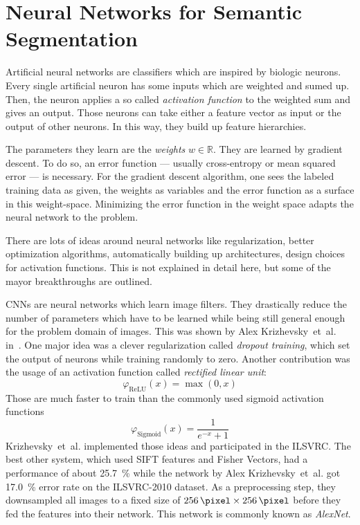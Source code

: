 
\section{Neural Networks for Semantic Segmentation}\label{sec:nn}

Artificial neural networks are classifiers which are inspired by biologic
neurons. Every single artificial neuron has some inputs which are weighted and
sumed up. Then, the neuron applies a so called \textit{activation function} to
the weighted sum and gives an output. Those neurons can take either a feature
vector as input or the output of other neurons. In this way, they build up
feature hierarchies.

The parameters they learn are the \textit{weights} $w \in \mathbb{R}$. They are
learned by gradient descent. To do so, an error function --- usually
cross-entropy or mean squared error --- is necessary. For the gradient descent
algorithm, one sees the labeled training data as given, the weights as
variables and the error function as a surface in this weight-space. Minimizing
the error function in the weight space adapts the neural network to the
problem.

There are lots of ideas around neural networks like regularization, better
optimization algorithms, automatically building up architectures, design
choices for activation functions. This is not explained in detail here, but
some of the mayor breakthroughs are outlined.

\Glspl{CNN} are neural networks which learn image filters. They drastically
reduce the number of parameters which have to be learned while being still
general enough for the problem domain of images. This was shown by Alex
Krizhevsky~et~al. in~\cite{krizhevsky2012imagenet}. One major idea was a clever
regularization called \textit{dropout training}, which set the output of
neurons while training randomly to zero. Another contribution was the usage of
an activation function called \textit{rectified linear unit}:
\[\varphi_{\text{ReLU}}(x) = \max(0, x)\]
Those are much faster to train than the commonly used sigmoid activation
functions
\[\varphi_{\text{Sigmoid}}(x) = \frac{1}{e^{-x} + 1}\]
Krizhevsky~et~al. implemented those ideas and participated in the
\gls{ILSVRC}. The best other system, which used SIFT features and Fisher
Vectors, had a performance of about \SI{25.7}{\percent} while the network by
Alex Krizhevsky~et~al. got \SI{17.0}{\percent} error rate on the ILSVRC-2010
dataset. As a preprocessing step, they downsampled all images to a fixed size
of $\SI{256}{\pixel} \times \SI{256}{\pixel}$ before they fed the features into
their network. This network is commonly known as \textit{AlexNet}.

